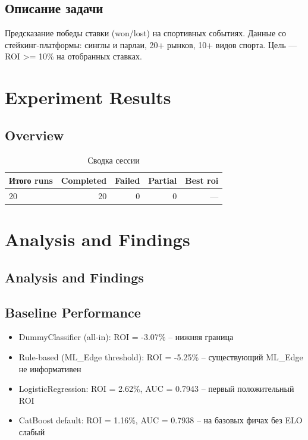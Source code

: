\documentclass[12pt,a4paper]{article}
\begin{document}
\subsection*{Описание задачи}
Предсказание победы ставки (won/lost) на спортивных событиях. Данные со стейкинг-платформы: синглы и парлаи, 20+ рынков, 10+ видов спорта. Цель — ROI >= 10\% на отобранных ставках.




\section{Experiment Results}

\subsection{Overview}

\begin{table}[H]
\centering
\caption{Сводка сессии}
\begin{tabular}{lrrrr}
\toprule
Итого runs & Completed & Failed & Partial & Best roi \\
\midrule
20 & \textcolor{passcolor}{20}
    & \textcolor{failcolor}{0}
    & \textcolor{partialcolor}{0}
    & --- \\
\bottomrule
\end{tabular}
\end{table}







\section{Analysis and Findings}

\subsection{Analysis and Findings}

\subsection{Baseline Performance}
\begin{itemize}
  \item DummyClassifier (all-in): ROI = -3.07\% -- нижняя граница
  \item Rule-based (ML\_Edge threshold): ROI = -5.25\% -- существующий ML\_Edge не информативен
  \item LogisticRegression: ROI = 2.62\%, AUC = 0.7943 -- первый положительный ROI
  \item CatBoost default: ROI = 1.16\%, AUC = 0.7938 -- на базовых фичах без ELO слабый
\end{itemize}
\end{document}
